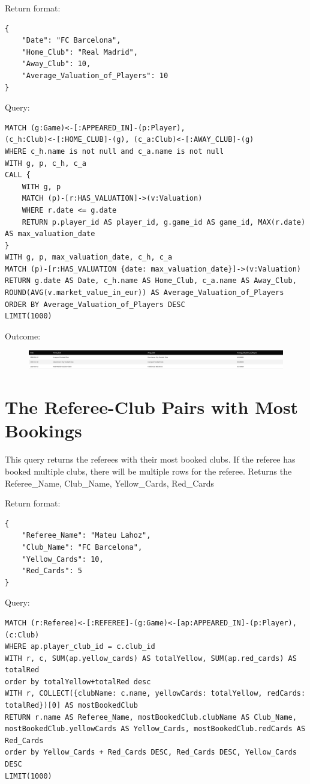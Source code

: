 \documentclass{Configuration_Files/PoliMi3i_thesis}
\begin{document}
Return format:
\begin{lstlisting}[style=json]
 {
    "Date": "FC Barcelona",
    "Home_Club": "Real Madrid",
    "Away_Club": 10,
    "Average_Valuation_of_Players": 10
}
\end{lstlisting}


Query:

\begin{lstlisting}[language=Cypher]
MATCH (g:Game)<-[:APPEARED_IN]-(p:Player),
(c_h:Club)<-[:HOME_CLUB]-(g), (c_a:Club)<-[:AWAY_CLUB]-(g)
WHERE c_h.name is not null and c_a.name is not null
WITH g, p, c_h, c_a
CALL {
    WITH g, p
    MATCH (p)-[r:HAS_VALUATION]->(v:Valuation)
    WHERE r.date <= g.date
    RETURN p.player_id AS player_id, g.game_id AS game_id, MAX(r.date) AS max_valuation_date
}
WITH g, p, max_valuation_date, c_h, c_a
MATCH (p)-[r:HAS_VALUATION {date: max_valuation_date}]->(v:Valuation)
RETURN g.date AS Date, c_h.name AS Home_Club, c_a.name AS Away_Club, ROUND(AVG(v.market_value_in_eur)) AS Average_Valuation_of_Players
ORDER BY Average_Valuation_of_Players DESC
LIMIT(1000)
\end{lstlisting}


Outcome:
\begin{figure}[H]
    \centering
    \includegraphics[width=\linewidth]{Project Template/Images/query_output/q7.png}
\end{figure}








\section{The Referee-Club Pairs with Most Bookings}
This query returns the referees with their most booked clubs. If the referee has booked multiple clubs, there will be multiple rows for the referee.
Returns the Referee\_Name, Club\_Name, Yellow\_Cards, Red\_Cards

Return format:
\begin{lstlisting}[style=json]
{
    "Referee_Name": "Mateu Lahoz",
    "Club_Name": "FC Barcelona",
    "Yellow_Cards": 10,
    "Red_Cards": 5
}
\end{lstlisting}


Query:

\begin{lstlisting}[language=Cypher]
MATCH (r:Referee)<-[:REFEREE]-(g:Game)<-[ap:APPEARED_IN]-(p:Player), (c:Club)
WHERE ap.player_club_id = c.club_id 
WITH r, c, SUM(ap.yellow_cards) AS totalYellow, SUM(ap.red_cards) AS totalRed
order by totalYellow+totalRed desc
WITH r, COLLECT({clubName: c.name, yellowCards: totalYellow, redCards: totalRed})[0] AS mostBookedClub
RETURN r.name AS Referee_Name, mostBookedClub.clubName AS Club_Name, mostBookedClub.yellowCards AS Yellow_Cards, mostBookedClub.redCards AS Red_Cards
order by Yellow_Cards + Red_Cards DESC, Red_Cards DESC, Yellow_Cards DESC
LIMIT(1000)
\end{lstlisting}
\end{document}
